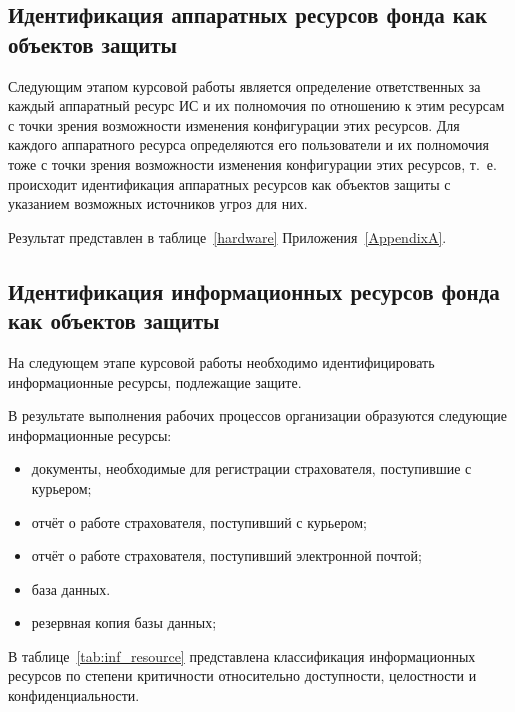 \subsection{Идентификация аппаратных ресурсов
  фонда как объектов защиты}

\point Следующим этапом курсовой работы является определение
ответственных за каждый аппаратный ресурс ИС и их полномочия по
отношению к этим ресурсам с точки зрения возможности изменения
конфигурации этих ресурсов. Для каждого аппаратного ресурса
определяются его пользователи и их полномочия тоже с точки зрения
возможности изменения конфигурации этих ресурсов, т.~е. происходит
идентификация аппаратных ресурсов как объектов защиты с указанием
возможных источников угроз для них.

\point Результат представлен в таблице~\ref{hardware} Приложения~\ref{AppendixA}.

\subsection{Идентификация информационных ресурсов
  фонда как объектов защиты}

\point На следующем этапе курсовой работы необходимо идентифицировать
информационные ресурсы, подлежащие защите.

\point В результате выполнения рабочих процессов организации
образуются следующие информационные ресурсы:

\begin{itemize}
\item документы, необходимые для регистрации страхователя, поступившие
  с курьером;
\item отчёт о работе страхователя, поступивший с курьером;
\item отчёт о работе страхователя, поступивший электронной почтой;
\item база данных.
\item резервная копия базы данных;
\end{itemize}

\point В таблице~\ref{tab:inf_resource} представлена классификация
информационных ресурсов по степени критичности относительно
доступности, целостности и конфиденциальности.

